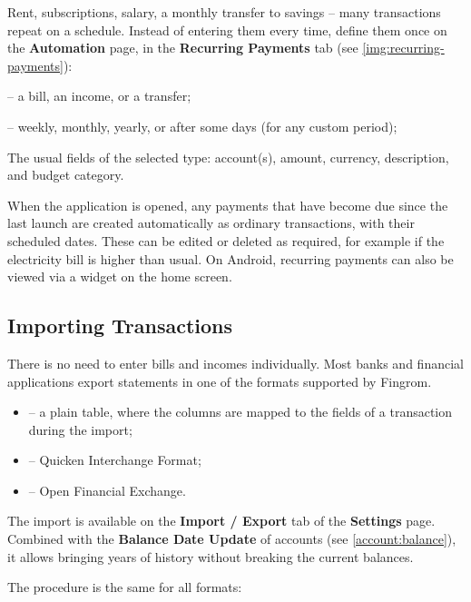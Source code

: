 Rent, subscriptions, salary, a monthly transfer to savings -- many transactions repeat on a
schedule. Instead of entering them every time, define them once on the \textbf{Automation}
page, in the \textbf{Recurring Payments} tab (see \cref{img:recurring-payments}):

\begin{description}
  \item[Type] -- a bill, an income, or a transfer;
  \item[Payment Interval] -- weekly, monthly, yearly, or
  after some days (for any custom period);
  \item The usual fields of the selected type: account(s), amount, currency, description,
  and budget category.
\end{description}

\noindent When the application is opened, any payments that have become due since the last
launch are created automatically as ordinary transactions, with their scheduled dates. These
can be edited or deleted as required, for example if the electricity bill is higher than
usual. On Android, recurring payments can also be viewed via a widget on the home screen.


\subsection{Importing Transactions}

There is no need to enter bills and incomes individually. Most banks and financial
applications export statements in one of the formats supported by Fingrom.

\begin{itemize}
  \item {} -- a plain table, where the columns are mapped to the fields of a transaction
  during the import;
  \item {} -- Quicken Interchange Format;
  \item {} -- Open Financial Exchange.
\end{itemize}

\noindent The import is available on the \textbf{Import / Export} tab of the
\textbf{Settings} page. Combined with the \textbf{Balance Date Update} of accounts
(see \cref{account:balance}), it allows bringing years of history without breaking the
current balances.

The procedure is the same for all formats:

